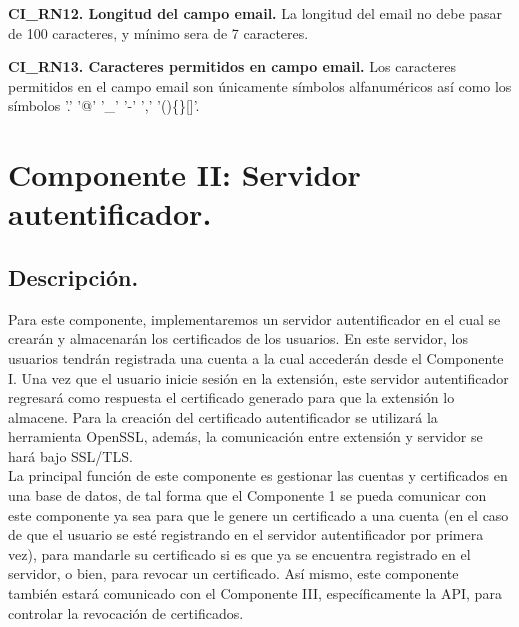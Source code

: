 \documentclass[12pt, a4paper, titlepage]{report}
\begin{document}
			\textbf{CI\_RN12. Longitud del campo email.}
			La longitud del email no debe pasar de 100 caracteres, y mínimo sera de 7 caracteres.\\
			\label{CI_RN12}
			
			\textbf{CI\_RN13. Caracteres permitidos en campo email.}
			Los caracteres permitidos en el campo email son únicamente símbolos alfanuméricos así como los símbolos '.' '@' '\_' '-' ',' '()\{\}[]'.\\
			\label{CI_RN13}
				
	        
	    \section{Componente II: Servidor autentificador.}
	        \subsection{Descripción.}
	        Para este componente, implementaremos un servidor autentificador en el cual se crearán y almacenarán los certificados de los usuarios. En este servidor, los usuarios tendrán registrada una cuenta a la cual accederán desde el Componente I. Una vez que el usuario inicie sesión en la extensión, este servidor autentificador regresará como respuesta el certificado generado para que la extensión lo almacene. 
	        Para la creación del certificado autentificador se utilizará la herramienta OpenSSL, además, la comunicación entre extensión y servidor se hará bajo SSL/TLS.\\
	        
	        La principal función de este componente es gestionar las cuentas y certificados en una base de datos, de tal forma que el Componente 1 se pueda comunicar con este componente ya sea para que le genere un certificado a una cuenta (en el caso de que el usuario se esté registrando en el servidor autentificador por primera vez), para mandarle su certificado si es que ya se encuentra registrado en el servidor, o bien, para revocar un certificado. Así mismo, este componente también estará comunicado con el Componente III, específicamente la API, para controlar la revocación de certificados.\\
	        
\end{document}
